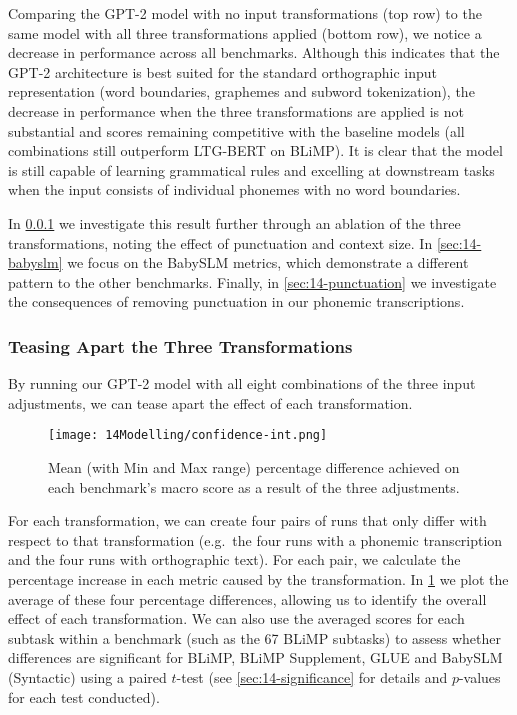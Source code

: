 Comparing the \mbox{GPT-2} model with no input transformations (top row) to the same model with all three transformations applied (bottom row), we notice a decrease in performance across all benchmarks. Although this indicates that the \mbox{GPT-2} architecture is best suited for the standard orthographic input representation (word boundaries, graphemes and subword tokenization), the decrease in performance when the three transformations are applied is not substantial and scores remaining competitive with the baseline models (all combinations still outperform LTG-BERT on BLiMP). It is clear that the model is still capable of learning grammatical rules and excelling at downstream tasks when the input consists of individual phonemes with no word boundaries. 

In \cref{sec:14-effect} we investigate this result further through an ablation of the three transformations, noting the effect of punctuation and context size. In \cref{sec:14-babyslm} we focus on the BabySLM metrics, which demonstrate a different pattern to the other benchmarks. Finally, in \cref{sec:14-punctuation} we investigate the consequences of removing punctuation in our phonemic transcriptions.

\subsubsection{Teasing Apart the Three Transformations}
\label{sec:14-effect}

By running our GPT-2 model with all eight combinations of the three input adjustments, we can tease apart the effect of each transformation.

\begin{figure}
    \centering
    \texttt{[image: 14Modelling/confidence-int.png]}
      \caption{Mean (with Min and Max range) percentage difference achieved on each benchmark's macro score as a result of the three adjustments.}
    \label{fix:14-condition-differences}
\vspace{-4mm}
\end{figure}

For each transformation, we can create four pairs of runs that only differ with respect to that transformation (e.g.\ the four runs with a phonemic transcription and the four runs with orthographic text). For each pair, we calculate the percentage increase in each metric caused by the transformation. In \cref{fix:14-condition-differences} we plot the average of these four percentage differences, allowing us to identify the overall effect of each transformation. We can also use the averaged scores for each subtask within a benchmark (such as the 67 BLiMP subtasks) to assess whether differences are significant for BLiMP, BLiMP Supplement, GLUE and BabySLM (Syntactic) using a paired $t$-test (see \cref{sec:14-significance} for details and $p$-values for each test conducted).

